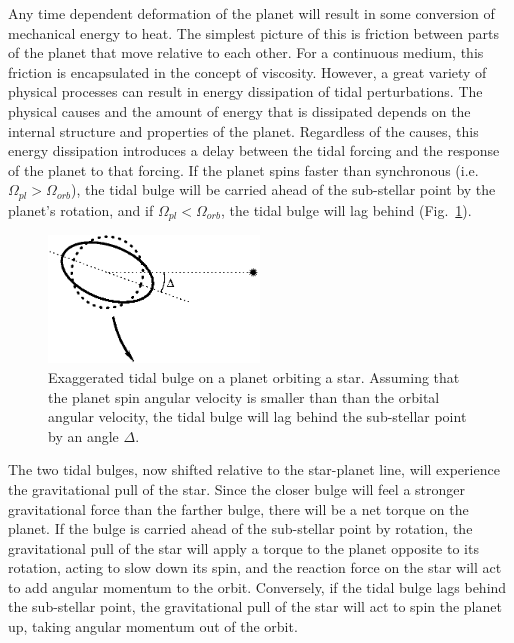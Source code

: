 Any time dependent deformation of the planet will result in some conversion of
mechanical energy to heat. The simplest picture of this is friction between
parts of the planet that move relative to each other. For a continuous medium,
this friction is encapsulated in the concept of viscosity. However, a great
variety of physical processes can result in energy dissipation of tidal
perturbations. The physical causes and the amount of energy that is dissipated
depends on the internal structure and properties of the planet.  Regardless of
the causes, this energy dissipation introduces a delay between the tidal forcing
and the response of the planet to that forcing. If the planet spins faster than
synchronous (i.e.  $\Omega_{pl} > \Omega_{orb}$), the tidal bulge will be
carried ahead of the sub-stellar point by the planet's rotation, and if
$\Omega_{pl} < \Omega_{orb}$, the tidal bulge will lag behind
(Fig.~\ref{fig:tidal_bulge}).

\begin{figure}[t]
%
    \centering
%
    \includegraphics[width=0.5\textwidth]{tidal_bulge.eps}
%
    \caption{
%
        Exaggerated tidal bulge on a planet orbiting a star. Assuming that the
        planet spin angular velocity is smaller than than the orbital angular
        velocity, the tidal bulge will lag behind the sub-stellar point by an
        angle $\Delta$.
%
    }
%
    \label{fig:tidal_bulge}
%
\end{figure}

The two tidal bulges, now shifted relative to the star-planet line, will
experience the gravitational pull of the star. Since the closer bulge will feel
a stronger gravitational force than the farther bulge, there will be a net
torque on the planet. If the bulge is carried ahead of the sub-stellar point by
rotation, the gravitational pull of the star will apply a torque to the planet
opposite to its rotation, acting to slow down its spin, and the reaction force
on the star will act to add angular momentum to the orbit. Conversely, if the
tidal bulge lags behind the sub-stellar point, the gravitational pull of the
star will act to spin the planet up, taking angular momentum out of the orbit.

